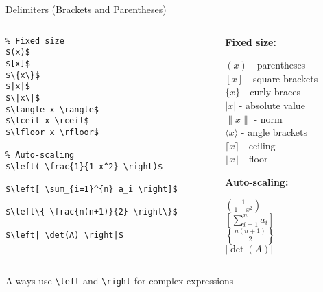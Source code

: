 \begin{frame}[fragile]{Delimiters (Brackets and Parentheses)}
    \begin{columns}
        \begin{column}{0.5\textwidth}
\begin{lstlisting}
% Fixed size
$(x)$
$[x]$
$\{x\}$
$|x|$
$\|x\|$
$\langle x \rangle$
$\lceil x \rceil$
$\lfloor x \rfloor$

% Auto-scaling
$\left( \frac{1}{1-x^2} \right)$

$\left[ \sum_{i=1}^{n} a_i \right]$

$\left\{ \frac{n(n+1)}{2} \right\}$

$\left| \det(A) \right|$
\end{lstlisting}
        \end{column}
        
        \begin{column}{0.5\textwidth}
            \textbf{Fixed size:}
            \begin{center}
                $(x)$ - parentheses\\
                $[x]$ - square brackets\\
                $\{x\}$ - curly braces\\
                $|x|$ - absolute value\\
                $\|x\|$ - norm\\
                $\langle x \rangle$ - angle brackets\\
                $\lceil x \rceil$ - ceiling\\
                $\lfloor x \rfloor$ - floor
            \end{center}
            
            \textbf{Auto-scaling:}
            \begin{center}
                $\left( \frac{1}{1-x^2} \right)$\\[5pt]
                $\left[ \sum_{i=1}^{n} a_i \right]$\\[5pt]
                $\left\{ \frac{n(n+1)}{2} \right\}$\\[5pt]
                $\left| \det(A) \right|$
            \end{center}
        \end{column}
    \end{columns}
    
    \begin{tip}
        Always use \texttt{\textbackslash left} and \texttt{\textbackslash right} for complex expressions
    \end{tip}
\end{frame}

